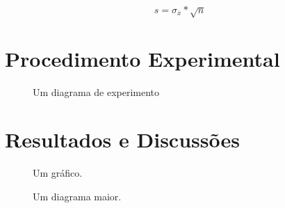 \documentclass[11pt, twocolumn]{article}
\begin{document}
                \begin{equation*}
                        s = \sigma_{\overline{x}} * \sqrt{n}
                \end{equation*}


        \section{Procedimento Experimental}
                \lipsum[5]
                \begin{figure}[!htp]
                        \centering
                        \caption{\small Um diagrama de experimento}
                        \label{DIAGRAMA}
                \end{figure}
                \lipsum[6]

        \section{Resultados e Discussões}
                \lipsum[4]
                \begin{figure}[!htp]
                        \centering
                        \caption{\small Um gráfico.}
                        \label{GRAFICO}
                \end{figure}

                \lipsum[7]

                \begin{figure*}[!htp]
                        \centering
                        \caption{\small Um diagrama maior.}
                        \label{DIAGRAMA_2}
                \end{figure*}

                \lipsum[10]
\end{document}
